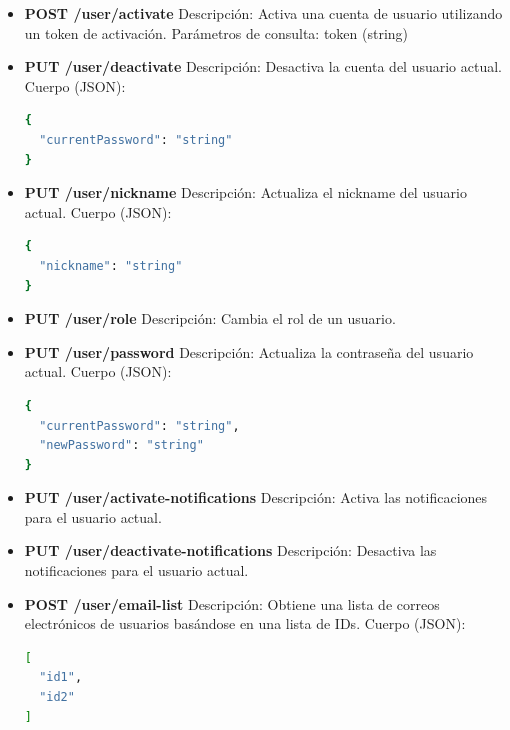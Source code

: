 \begin{itemize}
\begin{itemize}
        \item \textbf{POST /user/activate}
        \newline Descripción: Activa una cuenta de usuario utilizando un token de activación.
        \newline Parámetros de consulta: token (string)

        \item \textbf{PUT /user/deactivate}
        \newline Descripción: Desactiva la cuenta del usuario actual.
        \newline Cuerpo (JSON):
\begin{lstlisting}[language=bash]
{
  "currentPassword": "string"
}
\end{lstlisting}

        \item \textbf{PUT /user/nickname}
        \newline Descripción: Actualiza el nickname del usuario actual.
        \newline Cuerpo (JSON):
\begin{lstlisting}[language=bash]
{
  "nickname": "string"
}
\end{lstlisting}

        \item \textbf{PUT /user/role}
        \newline Descripción: Cambia el rol de un usuario.

        \item \textbf{PUT /user/password}
        \newline Descripción: Actualiza la contraseña del usuario actual.
        \newline Cuerpo (JSON):
\begin{lstlisting}[language=bash]
{
  "currentPassword": "string",
  "newPassword": "string"
}
\end{lstlisting}

        \item \textbf{PUT /user/activate-notifications}
        \newline Descripción: Activa las notificaciones para el usuario actual.

        \item \textbf{PUT /user/deactivate-notifications}
        \newline Descripción: Desactiva las notificaciones para el usuario actual.

        \item \textbf{POST /user/email-list}
        \newline Descripción: Obtiene una lista de correos electrónicos de usuarios basándose en una lista de IDs.
        \newline Cuerpo (JSON):
\begin{lstlisting}[language=bash]
[
  "id1",
  "id2"
]
\end{lstlisting}
    \end{itemize}


\end{itemize}
